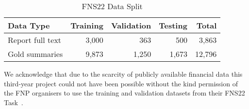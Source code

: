 \begin{table}[h]
    \centering
    \begin{tabular}{lrrr r}
        \hline
        Data Type & Training & Validation & Testing & Total \\
        \midrule
        Report full text & 3,000 & 363 & 500 & 3,863 \\
        Gold summaries & 9,873 & 1,250 & 1,673 & 12,796 \\
        \bottomrule
    \end{tabular}
    \caption{FNS22 Data Split}
    \label{tab:fns22-data}
\end{table}

We acknowledge that due to the scarcity of publicly available financial data this third-year project could not have been possible without the kind permission of the FNP organisers to use the training and validation datasets from their FNS22 Task~\cite{fnp-2022-financial}.

